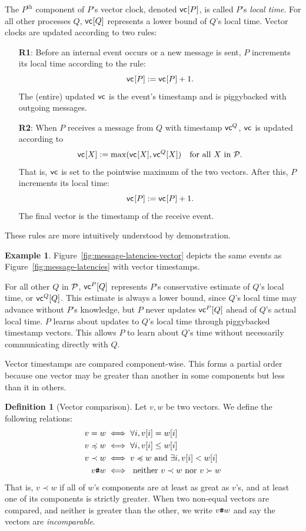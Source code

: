 \documentclass[]             %
{NASA}                       %
\theoremstyle{definition}
\newtheorem{example}[theorem]{Example}
\newtheorem{definition}[theorem]{Definition}
\begin{document}
The $P^\textrm{th}$ component of $P$'s vector clock, denoted
$\mathsf{vc}^{}[P]$, is called $P$'s \emph{local time}. For all other processes
$Q$, $\mathsf{vc}^{}[Q]$ represents a lower bound of $Q$'s local time. Vector
clocks are updated according to two rules:
\begin{enumerate}
\item[\textbf{R1}:] Before an internal event occurs or a new message is sent, $P$
  increments its local time according to the rule:
  \[\mathsf{vc}^{}[P] := \mathsf{vc}^{}[P] + 1.\]
  The (entire) updated $\mathsf{vc}^{}$ is the event's timestamp and is piggybacked with outgoing messages.
\item[\textbf{R2}:] When $P$ receives a message from $Q$ with timestamp
  $\mathsf{vc}^{Q}$, $\mathsf{vc}^{}$ is updated according to
  \[\mathsf{vc}^{}[X] := \max(\mathsf{vc}^{}[X], \mathsf{vc}^{Q}[X]) \quad \textrm{for all $X$ in $\mathcal{P}$}.\]
  That is, $\mathsf{vc}^{}$ is set to the pointwise maximum of the two
  vectors. After this, $P$ increments its local time:
  \[ \mathsf{vc}^{}[P] := \mathsf{vc}^{}[P] + 1.\]
  The final vector is the timestamp of the receive event.
\end{enumerate}
These rules are more intuitively understood by demonstration.

\begin{example}
  Figure~\ref{fig:message-latencies-vector} depicts the same events as
  Figure~\ref{fig:message-latencies} with vector timestamps.
\end{example}

For all other $Q$ in $\mathcal{P}$, $\mathsf{vc}^{P}[Q]$ represents $P$'s
conservative estimate of $Q$'s local time, or $\mathsf{vc}^{Q}[Q]$. This
estimate is always a lower bound, since $Q$'s local time may advance
without $P$'s knowledge, but $P$ never updates $\mathsf{vc}^{P}[Q]$ ahead of
$Q$'s actual local time. $P$ learns about updates to $Q$'s local time
through piggybacked timestamp vectors. This allows $P$ to learn about
$Q$'s time without necessarily communicating directly with $Q$.

Vector timestamps are compared component-wise. This forms a partial
order because one vector may be greater than another in some
components but less than it in others.

\begin{definition}[Vector comparison]
  Let $v, w$ be two vectors. We define the following relations:
  \begin{align*}
             v = w &\iff \forall i, v[i] = w[i] \\
  v \preccurlyeq w &\iff \forall i, v[i] \leq w[i] \\
         v \prec w &\iff v \preccurlyeq w \textrm{ and } \exists i, v[i] < w[i] \\
            v {\textrm{\texttt{\#}}} w &\iff \textrm{ neither } v \prec w \textrm{ nor } v \succ w
  \end{align*}
  That is, $v \prec w$ if all of $w$'s components are at least as
  great as $v$'s, and at least one of its components is strictly
  greater. When two non-equal vectors are compared, and neither is
  greater than the other, we write $v {\textrm{\texttt{\#}}} w$ and say the vectors
  are \emph{incomparable}.
\end{definition}
\end{document}
